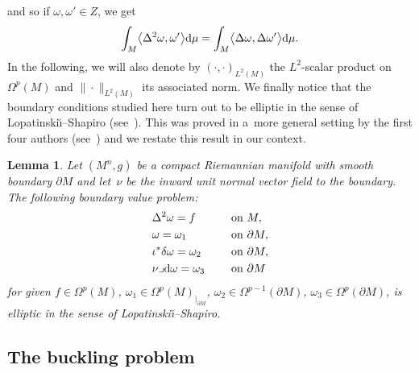 \documentclass[10pt,a4paper]{amsart}
\numberwithin{equation}{section}
\newtheorem{Lemma}[Theorem]{Lemma}
\theoremstyle{definition}
\begin{document}
and so if $\omega,\omega'\in Z$, we get
\begin{equation}\label{eq:partialintDeltacons}
\int_M\bigl\langle\Delta^2\omega,\omega'\bigr\rangle {\rm d}\mu=\int_M\bigl\langle\Delta \omega,\Delta\omega'\bigr\rangle {\rm d}\mu.
\end{equation}
In the following, we will also denote by $(\cdot,\cdot)_{L^2(M)}$ the $L^2$-scalar product on $\Omega^p(M)$ and $\|\cdot\|_{L^2(M)}$ its associated norm.
We finally notice that the boundary conditions studied here turn out to be elliptic in the sense of Lopatinski\u{\i}--Shapiro (see~\cite[Definition~1.6.1]{Sc}). This was proved in a~more general setting by the first four authors (see~\cite[Lemma~6.1]{EGHM}) and we restate this result in our context.
\begin{Lemma}\label{elliptic_problem}
Let $(M^n,g)$ be a compact Riemannian manifold with smooth boundary $\partial M$ and let~$\nu$ be the inward unit normal vector field to the boundary. The following boundary value problem:
\[
\begin{aligned}
&\Delta^2\omega=f\ \quad &&\textrm{on }M,\\
&\omega = \omega_1 \ \quad && \textrm{on }\partial M,\\
&\iota^*\delta\omega =\omega_2\ \quad &&\textrm{on }\partial M,\\
&\nu\lrcorner {\rm d}\omega =\omega_3\ \quad && \textrm{on }\partial M
\end{aligned}
\]
for given $f\in\Omega^p(M)$, $\omega_1\in\Omega^p(M)_{|_{\partial M}}$, $\omega_2\in\Omega^{p-1}(\partial M)$, $\omega_3\in\Omega^p(\partial M)$, is elliptic in the sense of Lopatinski\u{\i}--Shapiro.
\end{Lemma}

\subsection{The buckling problem}
\end{document}
